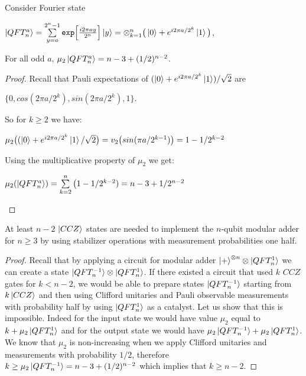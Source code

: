 \documentclass[12pt]{dalthesis}
\begin{document}
\begin{proposition}
Consider Fourier state
\begin{center}
$\ket{QFT_n^a} = \sum\limits_{y=o}^{2^n-1} \texttt{exp}\Big[ \frac{i2\pi ay}{2^n} \Big] \ket{y} = \otimes_{k=1}^n \big( \ket{0} + e^{i2\pi a/2^k}\ket{1}\big)$,
\end{center}
For all odd $a$, $\mu_2\ket{QFT_n^a} = n-3 +(1/2)^{n-2}$.
\end{proposition}
\begin{proof}
Recall that Pauli expectations of $(\ket{0} + e^{i2\pi a/2^k}\ket{1})/\sqrt{2}$ are
\begin{center}
$\{ 0, cos(2\pi a/2^k), sin(2\pi a/2^k), 1 \}$.
\end{center}
So for $k \geq 2$ we have:
\begin{center}
$\mu_2 \big( (\ket{0} + e^{i2\pi a/2^k} \ket{1}/\sqrt{2} \big) = v_2 \big( sin(\pi a/2^{k-1}) \big) = 1 - 1/2^{k-2}$
\end{center}
Using the multiplicative property of $\mu_2$ we get:
\begin{center}
$\mu_2 (\ket{QFT_n^a}) = \sum\limits_{k=2}^n \big( 1-1/2^{k-2}) = n-3 + 1/2^{n-2}$
\end{center}
\end{proof}

\begin{lemma}
At least $n-2$ $\ket{CCZ}$ states are needed to implement the $n$-qubit modular adder for $n \geq 3$ by using stabilizer operations with measurement probabilities one half.
\end{lemma}
\begin{proof}
Recall that by applying a circuit for modular adder $\ket{+}^{\otimes n} \otimes \ket{QFT_n^1}$ we can create a state $\ket{QFT_n^{-1}} \otimes \ket{QFT_n^1}$. If there existed a circuit that used $k$ $CCZ$ gates for $k < n-2$, we would be able to prepare states $\ket{QFT_n^{-1}}$ starting from $k \ket{CCZ}$ and then using Clifford unitaries and Pauli observable measurements with probability half by using $\ket{QFT_n^1}$ as a catalyst. Let us show that this is impossible. Indeed for the input state we would have value $\mu_2$ equal to $k + \mu_2 \ket{QFT_n^1}$ and for the output state we would have $\mu_2 \ket{QFT_n^{-1}} + \mu_2 \ket{QFT_n^1}$. We know that $\mu_2$ is non-increasing when we apply Clifford unitaries and measurements with probability $1/2$, therefore $k \geq \mu_2 \ket{QFT_n^{-1}} = n - 3 +(1/2)^{n-2}$ which implies that $k \geq n-2$.
\end{proof}
\end{document}
